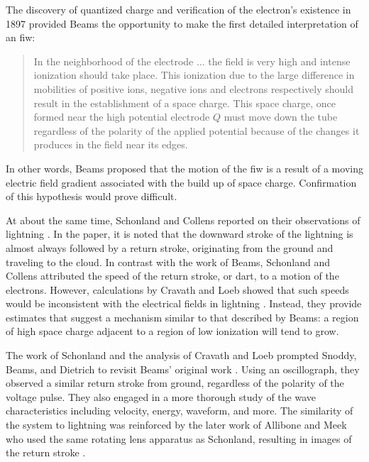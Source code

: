 The discovery of quantized charge and verification of the electron's existence
in 1897 \cite{Thomson1897} provided Beams the opportunity to make the first
detailed interpretation of an \acs{fiw}:
\begin{quote}
  In the neighborhood of the electrode $\ldots{}$ the field is very high and
  intense ionization should take place. This ionization due to the large
  difference in mobilities of positive ions, negative ions and electrons
  respectively should result in the establishment of a space charge. This space
  charge, once formed near the high potential electrode $Q$ must move down the
  tube regardless of the polarity of the applied potential because of the
  changes it produces in the field near its edges.
\end{quote}
In other words, Beams proposed that the motion of the \acs{fiw} is a result of a
moving electric field gradient associated with the build up of space charge.
Confirmation of this hypothesis would prove difficult.

At about the same time, Schonland and Collens reported on their observations of
lightning \cite{Schonland1933}. In the paper, it is noted that the downward
stroke of the lightning is almost always followed by a return stroke,
originating from the ground and traveling to the cloud. In contrast with the
work of Beams, Schonland and Collens attributed the speed of the return stroke,
or dart, to a motion of the electrons. However, calculations by Cravath and Loeb
showed that such speeds would be inconsistent with the electrical fields in
lightning \cite{Cravath1935}. Instead, they provide estimates that suggest a
mechanism similar to that described by Beams: a region of high space charge
adjacent to a region of low ionization will tend to grow.

The work of Schonland and the analysis of Cravath and Loeb prompted Snoddy,
Beams, and Dietrich to revisit Beams' original work \cite{Snoddy1936}. Using an
oscillograph, they observed a similar return stroke from ground, regardless of
the polarity of the voltage pulse. They also engaged in a more thorough
study of the wave characteristics including velocity, energy, waveform, and
more. The similarity of the system to lightning was reinforced by the later work
of Allibone and Meek who used the same rotating lens apparatus as Schonland,
resulting in images of the return stroke \cite{Allibone1938}.

